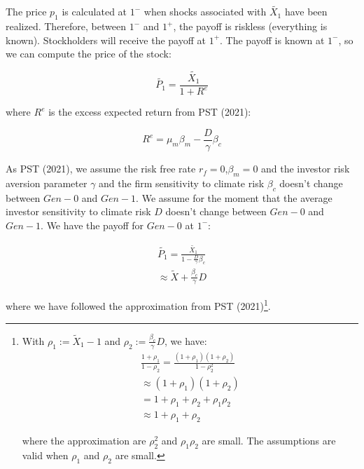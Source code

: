 The price $p_1$ is calculated at $1^{-}$ when
shocks associated with $\tilde{X_1}$ 
have been realized. Therefore, 
between $1^{-}$ and $1^{+}$, the payoff is
riskless (everything is known).
Stockholders will 
receive the payoff at $1^{+}$.
The payoff is known at $1^{-}$, so 
we can compute the price of the stock:

\begin{equation}
    \tilde{P_1} = \frac{\tilde{X_1}}{1 + R^e}
\end{equation}

where $R^e$ is the excess expected return 
from PST (2021):

\begin{equation}
    R^e = \mu_m \beta_m - \frac{D}{\gamma} \beta_{c}
\end{equation}

As PST (2021), we assume the 
risk free rate $r_f = 0$,$\beta_m = 0$ and the investor 
risk aversion parameter $\gamma$ and the 
firm sensitivity to climate risk $\beta_{c}$
doesn't change between $Gen-0$ and $Gen-1$.
We assume for the moment that the average 
investor sensitivity to climate risk $D$ 
doesn't change between $Gen-0$ and $Gen-1$.
We have the payoff for $Gen-0$ at $1^{-}$:

\begin{equation}
    \begin{aligned}
    \tilde{P_1} = \frac{\tilde{X_1}}{1 - \frac{D}{\gamma} \beta_{c}} \\
    \approx \tilde{X} + \frac{\beta_{c}}{\gamma}D
    \end{aligned}
\end{equation}

where we have followed the approximation
from PST (2021)\footnote{
With $\rho_1 := \tilde{X}_1 - 1$ and $\rho_2 := \frac{\beta_{c}}{\gamma}D$,
we have:
\begin{equation}
    \begin{aligned}
        \frac{1 + \rho_1}{1 - \rho_2} = \frac{(1 + \rho_1)(1 + \rho_2)}{1 - \rho_2^2} \\
        \approx (1 + \rho_1)(1 + \rho_2) \\
        = 1 + \rho_1 + \rho_2 + \rho_1 \rho_2 \\
        \approx 1 + \rho_1 + \rho_2
    \end{aligned}
\end{equation}

where the approximation are $\rho^2_2$ and $\rho_1 \rho_2$ are small.
The assumptions are valid when $\rho_1$ and $\rho_2$ are small.
}.

